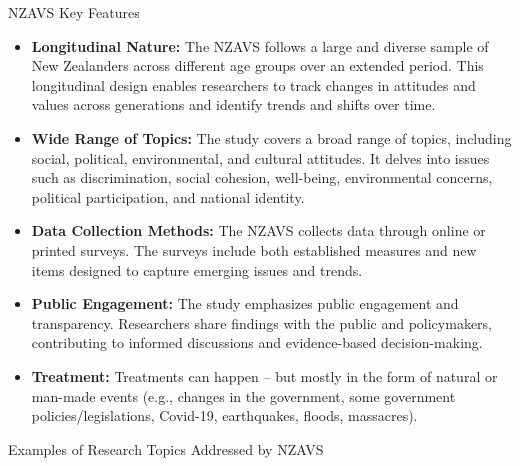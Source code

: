 \documentclass[
  ignorenonframetext,
  aspectratio=169,
]{beamer}
\providecommand{\tightlist}{%
  \setlength{\itemsep}{0pt}\setlength{\parskip}{0pt}}\usepackage{longtable,booktabs,array}
\begin{document}
\begin{frame}{NZAVS Key Features}
\label{nzavs-key-features}
\begin{itemize}[<+->]
\tightlist
\item
  \textbf{Longitudinal Nature:} The NZAVS follows a large and diverse
  sample of New Zealanders across different age groups over an extended
  period. This longitudinal design enables researchers to track changes
  in attitudes and values across generations and identify trends and
  shifts over time.
\item
  \textbf{Wide Range of Topics:} The study covers a broad range of
  topics, including social, political, environmental, and cultural
  attitudes. It delves into issues such as discrimination, social
  cohesion, well-being, environmental concerns, political participation,
  and national identity.
\item
  \textbf{Data Collection Methods:} The NZAVS collects data through
  online or printed surveys. The surveys include both established
  measures and new items designed to capture emerging issues and trends.
\end{itemize}
\end{frame}

\begin{frame}
\begin{itemize}[<+->]
\tightlist
\item
  \textbf{Public Engagement:} The study emphasizes public engagement and
  transparency. Researchers share findings with the public and
  policymakers, contributing to informed discussions and evidence-based
  decision-making.
\item
  \textbf{Treatment:} Treatments can happen -- but mostly in the form of
  natural or man-made events (e.g., changes in the government, some
  government policies/legislations, Covid-19, earthquakes, floods,
  massacres).
\end{itemize}
\end{frame}

\begin{frame}{Examples of Research Topics Addressed by NZAVS}
\label{examples-of-research-topics-addressed-by-nzavs}
\end{frame}
\end{document}
